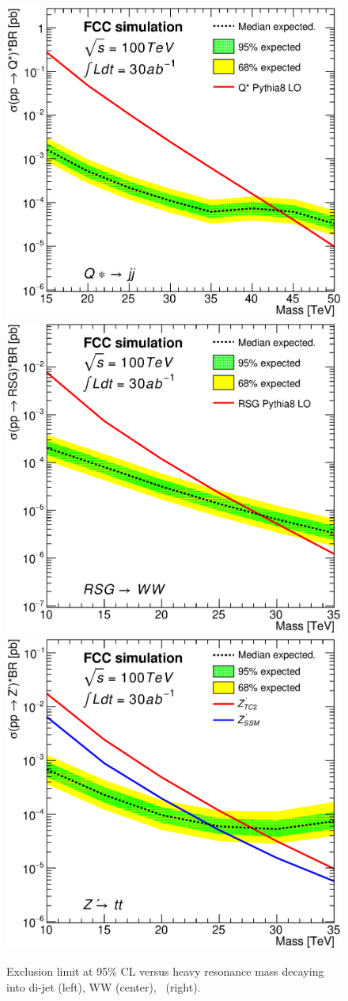 \documentclass{cernrep}
\begin{document}
\begin{figure}[!htb]
  \centering
  \includegraphics[width=0.30\columnwidth]{Fig/lim_Qstar_jj_fcc_v02.eps}
  \includegraphics[width=0.30\columnwidth]{Fig/lim_RSGraviton_ww_fcc_v02.eps}
  \includegraphics[width=0.30\columnwidth]{Fig/lim_Zprime_tt_fcc_v02.eps}
  \caption{Exclusion limit at 95\% CL versus heavy resonance mass decaying into di-jet (left), WW (center), \ttbar\ (right).}
  \label{figure:hadronicresonances:limits}
\end{figure}
\end{document}
